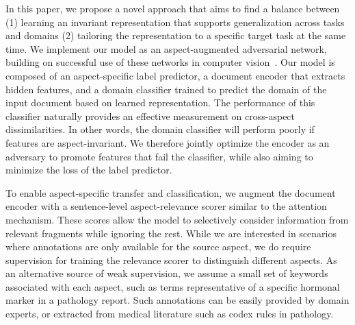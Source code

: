 In this paper, we propose a novel approach that aims to find a balance between (1) learning an invariant representation that supports generalization across tasks and domains (2) tailoring the representation to a specific target task at the same time. We implement our model as an aspect-augmented adversarial network, building on successful use of these networks in computer vision~\cite{ganin2014unsupervised}. Our model is composed of an aspect-specific label predictor, a document encoder that extracts hidden features, and a domain classifier trained to predict the domain of the input document based on learned representation. The performance of this classifier naturally provides an effective measurement on cross-aspect dissimilarities. In other words, the domain classifier will perform poorly if features are aspect-invariant. We therefore jointly optimize the encoder as an adversary to promote features that fail the classifier, while also aiming to minimize the loss of the label predictor. 



To enable aspect-specific transfer and classification, we augment the document encoder with a sentence-level aspect-relevance scorer similar to the attention mechanism. These scores allow the model to selectively consider information from relevant fragments while ignoring the rest. While we are interested in scenarios where annotations are only available for the source aspect, we do require supervision for training the relevance scorer to distinguish different aspects. As an alternative source of weak supervision, we assume a small set of keywords associated with each aspect, such as terms representative of a specific hormonal marker in a pathology report. Such annotations can be easily provided by domain experts, or extracted from medical literature such as codex rules in pathology.  


